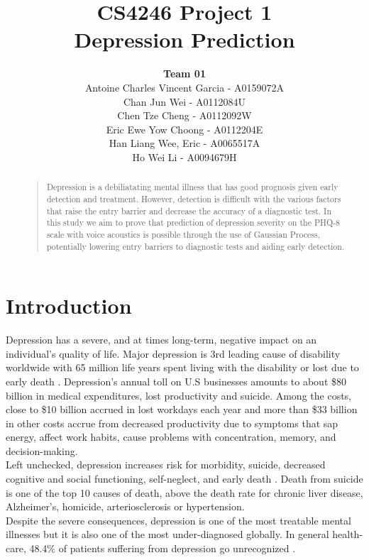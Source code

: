 \documentclass{article}
\title{
	CS4246 Project 1\\ Depression Prediction
}
\author{
	{\bf Team 01} \\
	Antoine Charles Vincent Garcia - A0159072A\\
	Chan Jun Wei - A0112084U\\
	Chen Tze Cheng - A0112092W\\
	Eric Ewe Yow Choong - A0112204E\\
	Han Liang Wee, Eric - A0065517A\\
	Ho Wei Li - A0094679H\\
}
\begin{document}
 	\maketitle

	\begin{abstract}
	\begin{quote}
	Depression is a debiliatating mental illness that has good prognosis given early detection and treatment. However, detection is difficult with the various factors that raise the entry barrier and decrease the accuracy of a diagnostic test. In this study we aim to prove that prediction of depression severity on the PHQ-8 scale with voice acoustics is possible through the use of Gaussian Process, potentially lowering entry barriers to diagnostic tests and aiding early detection.\\
	\end{quote}
	\end{abstract}
	
	\section{Introduction}
	Depression has a severe, and at times long-term, negative impact on an individual's quality of life. 
	Major depression is 3rd leading cause of disability worldwide with 65 million life years spent living with the disability or lost due to early death \cite{who2004}.
	Depression's annual toll on U.S businesses amounts to about \$80 billion in medical expenditures, lost productivity and suicide. Among the costs, close to \$10 billion accrued in lost workdays each year and more than \$33 billion in other costs accrue from decreased productivity due to symptoms that sap energy, affect work habits, cause problems with concentration, memory, and decision-making. \cite{tjcp2015}\\

	Left unchecked, depression increases risk for morbidity, suicide, decreased cognitive and social functioning, self-neglect, and early death \cite{arcp2009}. Death from suicide is one of the top 10 causes of death, above the death rate for chronic liver disease, Alzheimer’s, homicide, arteriosclerosis or hypertension. \cite{nvsr2016}\\
	
	Despite the severe consequences, depression is one of the most treatable mental illnesses but it is also one of the most under-diagnosed globally. In general health-care, 48.4\% of 		patients suffering from depression go unrecognized \cite{jama2003}.\\
\end{document}
